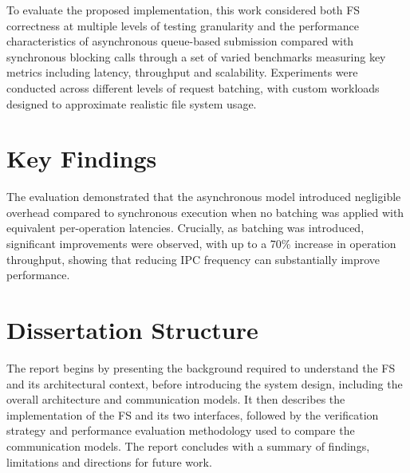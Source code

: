 To evaluate the proposed implementation, this work considered both FS correctness at multiple levels of testing granularity and the performance characteristics of asynchronous queue-based submission compared with synchronous blocking calls through a set of varied benchmarks measuring key metrics including latency, throughput and scalability. Experiments were conducted across different levels of request batching, with custom workloads designed to approximate realistic file system usage. 

\section{Key Findings}

The evaluation demonstrated that the asynchronous model introduced negligible overhead compared to synchronous execution when no batching was applied with equivalent per-operation latencies. Crucially, as batching was introduced, significant improvements were observed, with up to a 70\% increase in operation throughput, showing that reducing IPC frequency can substantially improve performance. 

\section{Dissertation Structure}

The report begins by presenting the background required to understand the FS and its architectural context, before introducing the system design, including the overall architecture and communication models. It then describes the implementation of the FS and its two interfaces, followed by the verification strategy and performance evaluation methodology used to compare the communication models. The report concludes with a summary of findings, limitations and directions for future work.